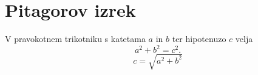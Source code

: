 \documentclass{article}
\begin{document}
\section*{Pitagorov izrek}
V pravokotnem trikotniku s katetama \(a\) in \(b\) ter hipotenuzo \(c\) velja
\[ a^2 + b^2 = c^2. \] \[c=\sqrt{a^2 + b^2}\]
\end{document}
